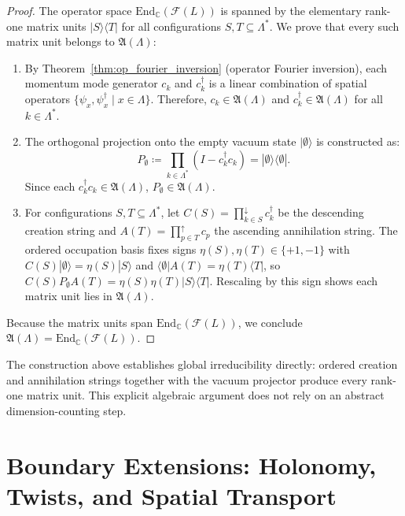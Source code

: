 \begin{proof}
The operator space $\mathrm{End}_{\mathbb{C}}(\mathcal{F}(L))$ is spanned by the elementary rank-one matrix units $|S\rangle\langle T|$ for all configurations $S, T \subseteq \Lambda^*$. We prove that every such matrix unit belongs to $\mathfrak{A}(\Lambda)$:
\begin{enumerate}
    \item By Theorem~\ref{thm:op_fourier_inversion} (operator Fourier inversion), each momentum mode generator $c_k$ and $c_k^\dagger$ is a linear combination of spatial operators $\{\psi_x, \psi_x^\dagger \mid x \in \Lambda\}$. Therefore, $c_k \in \mathfrak{A}(\Lambda)$ and $c_k^\dagger \in \mathfrak{A}(\Lambda)$ for all $k \in \Lambda^*$.
    \item The orthogonal projection onto the empty vacuum state $|\emptyset\rangle$ is constructed as:
    \begin{equation}
    P_\emptyset \coloneqq \prod_{k \in \Lambda^*} (I - c_k^\dagger c_k) = |\emptyset\rangle\langle\emptyset|.
    \end{equation}
    Since each $c_k^\dagger c_k \in \mathfrak{A}(\Lambda)$, $P_\emptyset \in \mathfrak{A}(\Lambda)$.
    \item For configurations $S,T\subseteq\Lambda^*$, let $C(S)=\prod_{k\in S}^{\downarrow}c_k^\dagger$ be the descending creation string and $A(T)=\prod_{p\in T}^{\uparrow}c_p$ the ascending annihilation string. The ordered occupation basis fixes signs $\eta(S),\eta(T)\in\{+1,-1\}$ with $C(S)|\emptyset\rangle=\eta(S)|S\rangle$ and $\langle\emptyset|A(T)=\eta(T)\langle T|$, so $C(S)P_\emptyset A(T)=\eta(S)\eta(T)|S\rangle\langle T|$. Rescaling by this sign shows each matrix unit lies in $\mathfrak{A}(\Lambda)$.
\end{enumerate}
Because the matrix units span $\mathrm{End}_{\mathbb{C}}(\mathcal{F}(L))$, we conclude $\mathfrak{A}(\Lambda) = \mathrm{End}_{\mathbb{C}}(\mathcal{F}(L))$.
\end{proof}

\begin{remark}
The construction above establishes global irreducibility directly: ordered creation and annihilation strings together with the vacuum projector produce every rank-one matrix unit. This explicit algebraic argument does not rely on an abstract dimension-counting step.
\end{remark}

\section{Boundary Extensions: Holonomy, Twists, and Spatial Transport}
\label{sec:boundary_extensions}

